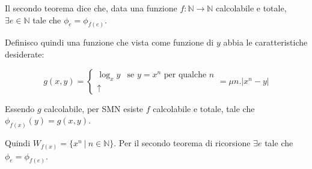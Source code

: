 Il secondo teorema dice che, data una funzione $f : \mathbb{N} \rightarrow \mathbb{N}$ calcolabile e totale, $\exists e \in \mathbb{N}$ tale che $\phi_e = \phi_{f(e)}$.

Definisco quindi una funzione che vista come funzione di $y$ abbia le caratteristiche desiderate:

$$
g(x,y) = \begin{cases}
\log_x y &\text{se } y = x^n \text{ per qualche }n \\
\uparrow
\end{cases} = \mu n . |x^n - y |
$$

Essendo $g$ calcolabile, per SMN esiste $f$ calcolabile e totale, tale che $\phi_{f(x)}(y) = g(x,y)$. 

Quindi $W_{f(x)} = \{ x^n \: | \: n \in \mathbb{N} \}$. Per il secondo teorema di ricorsione $\exists e$ tale che $\phi_e = \phi_{f(e)}$.

